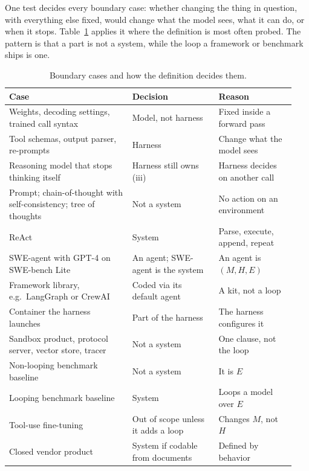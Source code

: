 One test decides every boundary case: whether changing the thing in question, with everything else
fixed, would change what the model sees, what it can do, or when it stops. Table~\ref{tab:boundary} applies
it where the definition is most often probed. The pattern is that a part is not a system, while the
loop a framework or benchmark ships is one.

\begin{table}[t]
  \caption{Boundary cases and how the definition decides them.}
  \label{tab:boundary}
  \footnotesize
  \begin{tabular}{@{}p{0.40\linewidth}p{0.29\linewidth}p{0.25\linewidth}@{}}
    \toprule
    Case & Decision & Reason \\
    \midrule
    Weights, decoding settings, trained call syntax & Model, not harness & Fixed inside a forward
    pass \\
    Tool schemas, output parser, re-prompts & Harness & Change what the model sees \\
    Reasoning model that stops thinking itself & Harness still owns (iii) & Harness decides on
    another call \\
    \midrule
    Prompt; chain-of-thought with self-consistency; tree of thoughts \citep{yao2023tot} & Not a system & No action on an environment \\
    ReAct \citep{yao2023react} & System & Parse, execute, append, repeat \\
    SWE-agent with GPT-4 on SWE-bench Lite & An agent; SWE-agent is the system
    \citep{yang2024sweagent} & An agent is $(M, H, E)$ \\
    \midrule
    Framework library, e.g.\ LangGraph \citep{langgraph} or CrewAI \citep{crewai} & Coded via its default agent &
    A kit, not a loop \\
    Container the harness launches \citep{wang2024openhands} & Part of the harness & The harness
    configures it \\
    Sandbox product, protocol server, vector store, tracer & Not a system & One clause, not the
    loop \\
    \midrule
    Non-looping benchmark baseline \citep{jimenez2024swebench} & Not a system & It is $E$ \\
    Looping benchmark baseline \citep{zhou2023webarena,xie2024osworld,yao2024taubench,chezelles2024browsergym} & System & Loops a model over $E$ \\
    Tool-use fine-tuning \citep{schick2023toolformer} & Out of scope unless it adds a loop &
    Changes $M$, not $H$ \\
    Closed vendor product \citep{claudecode} & System if codable from documents & Defined by
    behavior \\
    \bottomrule
  \end{tabular}
\end{table}


